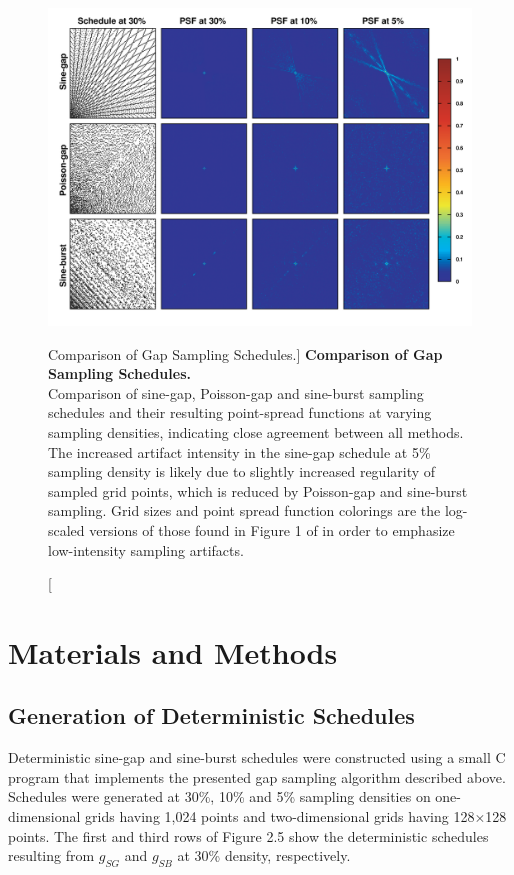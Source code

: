 \begin{figure}[ht!]
\includegraphics[width=6.5in]{figs/dgs/05-psf.png}
\caption
      [Comparison of Gap Sampling Schedules.]{
  {\bf Comparison of Gap Sampling Schedules.}
  \\
  Comparison of sine-gap, Poisson-gap and sine-burst sampling schedules and
  their resulting point-spread functions at varying sampling densities,
  indicating close agreement between all methods. The increased artifact
  intensity in the sine-gap schedule at 5\% sampling density is likely due
  to slightly increased regularity of sampled grid points, which is reduced
  by Poisson-gap and sine-burst sampling. Grid sizes and point spread function
  colorings are the log-scaled versions of those found in Figure 1 of
  \cite{hoch:acr2014} in order to emphasize low-intensity sampling artifacts.
}
\end{figure}

\section{Materials and Methods}

\subsection{Generation of Deterministic Schedules}

\begin{doublespace}
Deterministic sine-gap and sine-burst schedules were constructed using a small
C program that implements the presented gap sampling algorithm described above.
Schedules were generated at 30\%, 10\% and 5\% sampling densities on
one-dimensional grids having 1,024 points and two-dimensional grids having
128$\times$128 points. The first and third rows of Figure 2.5 show the
deterministic schedules resulting from $g_{SG}$ and $g_{SB}$ at 30\%
density, respectively.
\end{doublespace}

